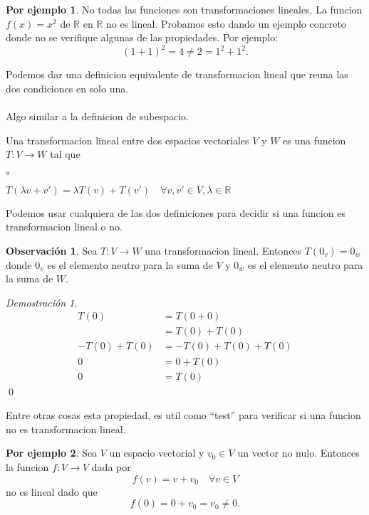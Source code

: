 \documentclass{article}
\theoremstyle{definition}
\theoremstyle{definition}
\newtheorem*{obs}{Observación}
\newtheorem*{ej}{Por ejemplo}
\theoremstyle{remark}
\newtheorem*{demo}{Demostración}
\begin{document}
\begin{ej}
  No todas las funciones son transformaciones lineales. La funcion $f(x)=x^2$ de $\mathbb{R}$ en $\mathbb{R}$ no es lineal. Probamos esto dando un ejemplo concreto donde no se verifique algunas de las propiedades. Por ejemplo: \[
    (1+1)^2=4\neq 2 = 1^2+1^2.
  \]
\end{ej}
Podemos dar una definicion equivalente de transformacion lineal que reuna las dos condiciones en solo una. \\\\ Algo similar a la definicion de subespacio. \begin{defi}
  Una transformacion lineal entre dos espacios vectoriales $V$ y $W$ es una funcion $T: V \to W$ tal que \begin{list}{$\circ$}{}  
  \item  $T(\lambda v + v' ) =\lambda T(v)+T(v') \quad \forall v,v' \in V, \lambda \in \mathbb{R}$
\end{list}
Podemos usar cualquiera de las dos definiciones para decidir si una funcion es transformacion lineal o no.
\end{defi}
\begin{obs}
  Sea $T : V \to W$ una transformacion lineal. Entonces $T(0_v)=0_w$ donde $0_v$ es el elemento neutro para la suma de $V$ y $0_w$ es el elemento neutro para la suma de $W$.
\end{obs}
\begin{demo}
  
    \begin{align}
      T(0)&=T(0+0) \tag{$0$ es elemento neutro} \\
          &= T(0)+T(0) \tag{$T$ es lineal} \\
      -T(0)+T(0) &= -T(0)+T(0)+T(0) \tag{logica} \\
      0 &= 0 + T(0) \tag{opuesto de la suma} \\ 
      0 &= T(0) \tag{neutro de la suma}
    \end{align}
 \qed 
\end{demo}
Entre otras cosas esta propiedad, es util como ``test'' para verificar si una funcion no es transformacion lineal.
\begin{ej}
  Sea $V$ un espacio vectorial y $v_0 \in V$ un vector no nulo. Entonces la funcion $f : V \to V $ dada por \[
f(v)=v+v_0 \quad \forall v \in V
  \]
  no es lineal dado que \[
f(0)=0+v_0=v_0 \neq 0.
  \]
\end{ej}
\end{document}
